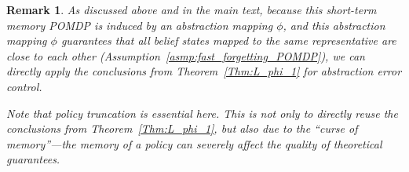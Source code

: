 \documentclass[twoside]{article}
\newtheorem{lemma}{Lemma}
\newtheorem{assumption}{Assumption}
\newtheorem{remark}{Remark}
\newcommand{\N}{\mathbb{N}}
\newcommand{\CAL}[1]{\mathcal{#1}}
\begin{document}

\begin{remark}
As discussed above and in the main text, because this short-term memory POMDP is induced by an abstraction mapping $\phi$, and this abstraction mapping $\phi$ guarantees that all belief states mapped to the same representative are close to each other (Assumption~\ref{asmp:fast_forgetting_POMDP}), we can directly apply the conclusions from Theorem~\ref{Thm:L_phi_1} for abstraction error control.

Note that policy truncation is essential here. This is not only to directly reuse the conclusions from Theorem~\ref{Thm:L_phi_1}, but also due to the “curse of memory”—the memory of a policy can severely affect the quality of theoretical guarantees.
\end{remark}
\end{document}

